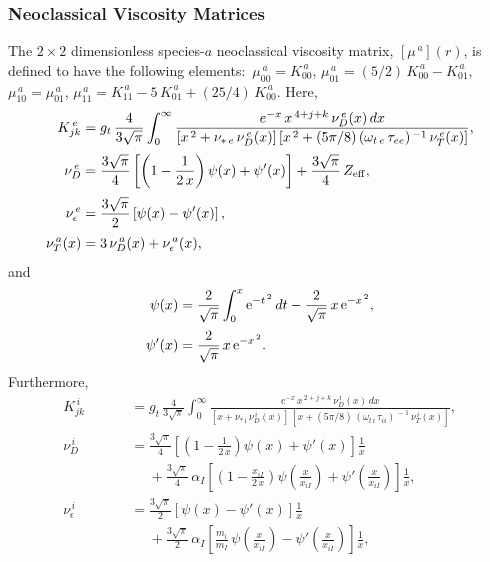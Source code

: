 \documentclass[12pt,prb,aps]{revtex4-1}
\begin{document}
\subsubsection{Neoclassical Viscosity Matrices}\label{vmatrix}
The $2\times 2$ dimensionless species-$a$ neoclassical viscosity matrix, $[\mu^{\,a}](r)$,  is defined to have the following elements:\,\cite{sigmar}
$\mu_{00}^{\,a} = K_{00}^{\,a}$, $\mu_{01}^{\,a}= (5/2)\,K_{00}^{\,a}- K_{01}^{\,a}$,
$\mu_{10}^{\,a}= \mu_{01}^{\,a}$,
$\mu_{11}^{\,a} = K_{11}^{\,a} - 5\,K_{01}^{\,a}+(25/4)\,K_{00}^{\,a}$.
Here,
\begin{align}
 K_{jk}^{\,e} &= g_t\,\frac{4}{3\sqrt{\pi}}\int_0^\infty
\frac{e^{-x}\,x^{\,4+j+k}\,\nu_D^{\,e}(x)\,dx}{[x^{\,2}+\nu_{\ast\,e}\,\nu_D^{\,e}(x)]\,[x^{\,2}+(5\pi/8)\,(\omega_{t\,e}\,\tau_{ee})^{\,-1}\,\nu_T^{\,e}(x)]},\\[0.5ex]
\nu_D^{\,e}&= \frac{3\sqrt{\pi}}{4}\left[\left(1-\frac{1}{2\,x}\right)\psi(x)+\psi'(x)\right]+\frac{3\sqrt{\pi}}{4}\,Z_{\rm eff},\\[0.5ex]
\nu_\epsilon^{\,e}&= \frac{3\sqrt{\pi}}{2}\left[\psi(x)-\psi'(x)\right],\\[0.5ex]
\nu_T^{\,a}(x) &= 3\,\nu_D^{\,a}(x)+\nu_{\epsilon}^{\,a}(x),
\end{align}
and
\begin{align}
\psi(x) &= \frac{2}{\sqrt{\pi}}\int_0^x{\rm e}^{-t^{\,2}}\,dt -\frac{2}{\sqrt{\pi}}\,x\,{\rm e}^{-x^{\,2}},\\[0.5ex]
\psi'(x)&= \frac{2}{\sqrt{\pi}}\,x\,{\rm e}^{-x^{\,2}}.
\end{align}
Furthermore, 
\begin{align}
 K_{jk}^{\,i} &=g_t\,\frac{4}{3\sqrt{\pi}}\int_0^\infty
\frac{e^{-x}\,x^{\,2+j+k}\,\nu_D^{\,i}(x)\,dx}{[x+\nu_{\ast\,i}\,\nu_D^{\,i}(x)]\,[x+(5\pi/8)\,(\omega_{t\,i}\,\tau_{ii})^{\,-1}\,\nu_T^{\,i}(x)]},\\[0.5ex]
 \nu_D^{\,i}&= \frac{3\sqrt{\pi}}{4}\left[\left(1-\frac{1}{2\,x}\right)\psi(x)+\psi'(x)\right]\frac{1}{x}\nonumber\\[0.5ex]\phantom{===}
&\phantom{=}+\frac{3\sqrt{\pi}}{4}\,\alpha_I\left[\left(1-\frac{x_{iI}}{2\,x}\right)\psi\!\left(\frac{x}{x_{iI}}\right)
+\psi'\!\left(\frac{x}{x_{iI}}\right)\right]\frac{1}{x},\\[0.5ex]
 \nu_\epsilon^{\,i}&=\frac{3\sqrt{\pi}}{2}\left[\psi(x)-\psi'(x)\right]\frac{1}{x}\nonumber\\[0.5ex]\phantom{===}
&\phantom{=}+\frac{3\sqrt{\pi}}{2}\,\alpha_I\left[\frac{m_i}{m_I}\,\psi\!\left(\frac{x}{x_{iI}}\right)
-\psi'\!\left(\frac{x}{x_{iI}}\right)\right]\frac{1}{x},
\end{align}
\end{document}

